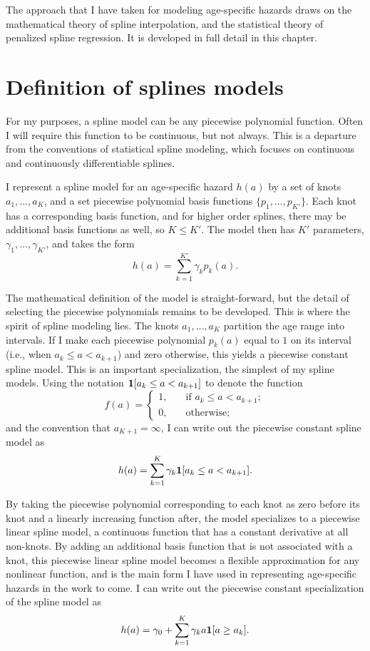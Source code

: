 The approach that I have taken for modeling age-specific hazards draws
on the mathematical theory of spline interpolation, and the
statistical theory of penalized spline regression.  It is developed in
full detail in this chapter.


\section{Definition of splines models}

For my purposes, a spline model can be any piecewise polynomial
function.  Often I will require this function to be continuous, but
not always.  This is a departure from the conventions of statistical
spline modeling, which focuses on continuous and continuously
differentiable splines.\cite{hastie_elements_2009,wahba_spline_1990}

I represent a spline model for an age-specific hazard $h(a)$ by a set
of knots $a_1,\dots,a_{K}$, and a set piecewise polynomial basis
functions $\{p_1,\ldots,p_{K'}\}$.  Each knot has a corresponding
basis function, and for higher order splines, there may be additional
basis functions as well, so $K \leq K'$.  The model then has $K'$
parameters, $\gamma_1,\ldots,\gamma_{K'}$, and takes the form
\[
h(a) = \sum_{k=1}^{K'} \gamma_k p_k(a).
\]

The mathematical definition of the model is straight-forward, but the
detail of selecting the piecewise polynomials remains to be developed.
This is where the spirit of spline modeling lies. The knots $a_1,
\dots, a_{K}$ partition the age range into intervals. If I make each
piecewise polynomial $p_k(a)$ equal to $1$ on its interval (i.e., when
$a_k \leq a < a_{k+1}$) and zero otherwise, this yields a piecewise
constant spline model.  This is an important specialization, the
simplest of my spline models.  Using the notation $\mathbf{1}[a_k \leq a <
  a_{k+1}]$ to denote the function 
\[f(a)
= \begin{cases}1,&\quad\text{if }a_k \leq a <
  a_{k+1};\\0,&\quad\text{otherwise;}\end{cases}
\]
 and the convention
that $a_{K+1} = \infty$, I can write out the piecewise constant spline
model as
\[
h(a) = \sum_{k=1}^K \gamma_k \mathbf{1}[a_k \leq a < a_{k+1}].
\]

By taking the piecewise polynomial corresponding to each knot as zero
before its knot and a linearly increasing function after, the model
specializes to a piecewise linear spline model, a continuous
function that has a constant derivative at all non-knots.  By adding
an additional basis function that is not associated with a knot, this
piecewise linear spline model becomes a flexible approximation for any
nonlinear function, and is the main form I have used in representing
age-specific hazards in the work to come.  I can write out the
piecewise constant specialization of the spline model as
\[
h(a) = \gamma_0 + \sum_{k=1}^K \gamma_k a \mathbf{1}[a \geq a_k].
\]

